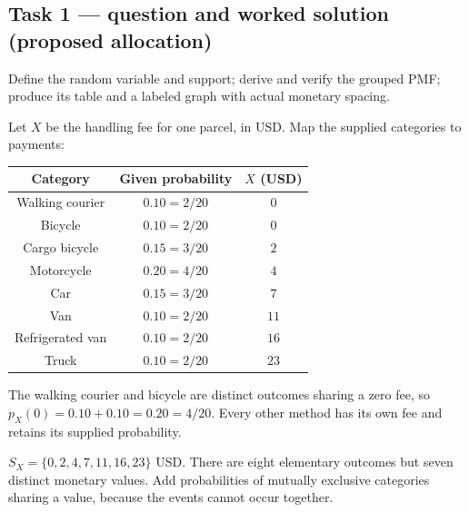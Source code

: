 \subsection*{Task 1 --- question and worked solution (proposed allocation) }
\label{sol:q3t1}

Define the random variable and support; derive and verify the grouped PMF; produce its table and a labeled graph with actual monetary spacing.

Let $X$ be the handling fee for one parcel, in USD. Map the supplied categories to payments:

\begin{center}
\begin{tabular}{ccc}\toprule
Category & Given probability & $X$ (USD)\\\midrule
Walking courier & $0.10=2/20$ & $0$\\
Bicycle & $0.10=2/20$ & $0$\\
Cargo bicycle & $0.15=3/20$ & $2$\\
Motorcycle & $0.20=4/20$ & $4$\\
Car & $0.15=3/20$ & $7$\\
Van & $0.10=2/20$ & $11$\\
Refrigerated van & $0.10=2/20$ & $16$\\
Truck & $0.10=2/20$ & $23$\\
\bottomrule\end{tabular}
\end{center}

The walking courier and bicycle are distinct outcomes sharing a zero fee, so $p_X(0)=0.10+0.10=0.20=4/20$. Every other method has its own fee and retains its supplied probability.

$S_X=\{0,2,4,7,11,16,23\}$ USD. There are eight elementary outcomes but seven distinct monetary values. Add probabilities of mutually exclusive categories sharing a value, because the events cannot occur together.

